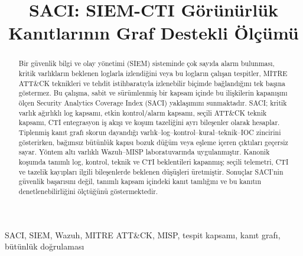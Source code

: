 \documentclass[conference]{IEEEtran}
\begin{document}
\title{SACI: SIEM-CTI Görünürlük Kanıtlarının Graf Destekli Ölçümü}

\author{
}

\maketitle

\begin{abstract}
Bir güvenlik bilgi ve olay yönetimi (SIEM) sisteminde çok sayıda alarm bulunması, kritik varlıkların beklenen loglarla izlendiğini veya bu logların çalışan tespitler, MITRE ATT\&CK teknikleri ve tehdit istihbaratıyla izlenebilir biçimde bağlandığını tek başına göstermez. Bu çalışma, sabit ve sürümlenmiş bir kapsam içinde bu ilişkilerin kapanışını ölçen Security Analytics Coverage Index (SACI) yaklaşımını sunmaktadır. SACI; kritik varlık ağırlıklı log kapsamı, etkin kontrol/alarm kapsamı, seçili ATT\&CK teknik kapsamı, CTI entegrasyon iş akışı ve koşum tazeliğini ayrı bileşenler olarak hesaplar. Tiplenmiş kanıt grafı skorun dayandığı varlık--log--kontrol--kural--teknik--IOC zincirini gösterirken, bağımsız bütünlük kapısı bozuk düğüm veya eşleme içeren çıktıları geçersiz sayar. Yöntem altı varlıklı Wazuh--MISP laboratuvarında uygulanmıştır. Kanonik koşumda tanımlı log, kontrol, teknik ve CTI beklentileri kapanmış; seçili telemetri, CTI ve tazelik kayıpları ilgili bileşenlerde beklenen düşüşleri üretmiştir. Sonuçlar SACI'nin güvenlik başarısını değil, tanımlı kapsam içindeki kanıt tamlığını ve bu kanıtın denetlenebilirliğini ölçtüğünü göstermektedir.
\end{abstract}

\begin{IEEEkeywords}
SACI, SIEM, Wazuh, MITRE ATT\&CK, MISP, tespit kapsamı, kanıt grafı, bütünlük doğrulaması
\end{IEEEkeywords}
\end{document}
